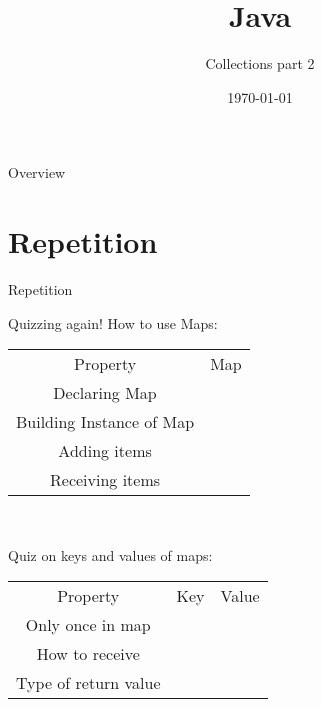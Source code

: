 


\usepackage{qtree}

\title{Java}
\subtitle{Collections part 2}
\date{\today}

\usepackage{color}



\begin{frame}
\titlepage
\end{frame}

\begin{frame}{Overview}
\tableofcontents
\end{frame}

\section{Repetition}

\begin{frame}{}
	\huge Repetition
\end{frame}

\begin{frame}{Quizzing again!}
	How to use Maps:\\
	\begin{tabular}{c|c}
		Property&Map\\
		Declaring Map&\\
		Building Instance of Map&\\
		Adding items&\\
		Receiving items&\\
	\end{tabular}\\
	\vspace{1cm}
	
	Quiz on keys and values of maps:\\
	\vspace{0.5cm}
	\begin{tabular}{c|c|c}
		Property&Key&Value\\
		Only once in map&&\\
		How to receive&&\\
		Type of return value&&\\
	\end{tabular}
\end{frame}

